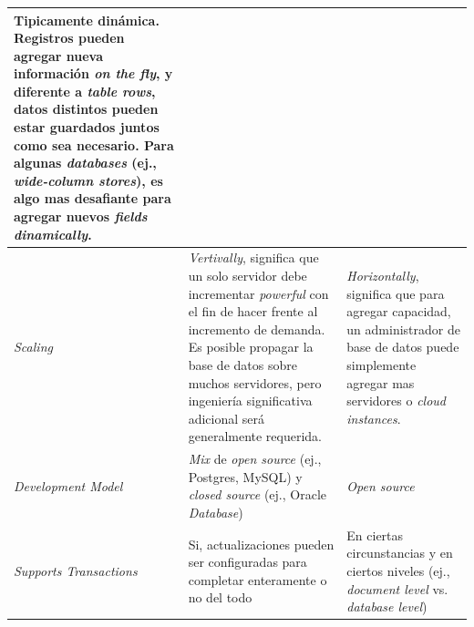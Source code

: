 \begin{table}[h!]
\begin{tabular}{ |L{0.1\paperwidth}|L{0.3\paperwidth}|L{0.3\paperwidth}|}
	Tipicamente dinámica. Registros pueden agregar nueva información \textit{on the fly}, y diferente a \textit{ table rows}, datos distintos pueden estar guardados juntos como sea necesario. Para algunas \textit{databases} (ej., \textit{wide-column stores}), es algo mas desafiante para agregar nuevos \textit{fields dinamically}.

\\ \hline
	\textit{Scaling}&%
	
	\textit{Vertivally}, significa que un solo servidor debe incrementar \textit{powerful} con el fin de hacer frente al incremento de demanda. Es posible propagar la base de datos  sobre muchos servidores, pero ingeniería significativa adicional será generalmente requerida.&
	
	\textit{Horizontally}, significa que para agregar capacidad, un administrador de base de datos puede simplemente agregar mas servidores o \textit{cloud instances}.
	
\\ \hline
	\textit{Development Model}&
	
	\textit{Mix} de \textit{open source} (ej., Postgres, MySQL) y \textit{closed source} (ej., Oracle \textit{Database})&
	\textit{Open source}
	
\\ \hline
	\textit{Supports Transactions}&
	
	Si, actualizaciones pueden ser configuradas para completar enteramente o no del todo&	
	
	En ciertas circunstancias y en ciertos niveles (ej., \textit{document level} vs. \textit{database level})
	

\end{tabular}
\end{table}
